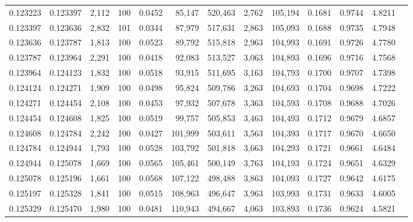\begin{tabular}{rrrrrrrrrrrrr}
0.123223 & 0.123397 & 2,112 & 100 &                                     0.0452 &  85,147 & 520,463 &   2,762 & 105,194 & 0.1681 & 0.9744 & 4.8211 \\
0.123397 & 0.123636 & 2,832 & 101 &                                     0.0344 &  87,979 & 517,631 &   2,863 & 105,093 & 0.1688 & 0.9735 & 4.7948 \\
0.123636 & 0.123787 & 1,813 & 100 &                                     0.0523 &  89,792 & 515,818 &   2,963 & 104,993 & 0.1691 & 0.9726 & 4.7780 \\
0.123787 & 0.123964 & 2,291 & 100 &                                     0.0418 &  92,083 & 513,527 &   3,063 & 104,893 & 0.1696 & 0.9716 & 4.7568 \\
0.123964 & 0.124123 & 1,832 & 100 &                                     0.0518 &  93,915 & 511,695 &   3,163 & 104,793 & 0.1700 & 0.9707 & 4.7398 \\
0.124124 & 0.124271 & 1,909 & 100 &                                     0.0498 &  95,824 & 509,786 &   3,263 & 104,693 & 0.1704 & 0.9698 & 4.7222 \\
0.124271 & 0.124454 & 2,108 & 100 &                                     0.0453 &  97,932 & 507,678 &   3,363 & 104,593 & 0.1708 & 0.9688 & 4.7026 \\
0.124454 & 0.124608 & 1,825 & 100 &                                     0.0519 &  99,757 & 505,853 &   3,463 & 104,493 & 0.1712 & 0.9679 & 4.6857 \\
0.124608 & 0.124784 & 2,242 & 100 &                                     0.0427 & 101,999 & 503,611 &   3,563 & 104,393 & 0.1717 & 0.9670 & 4.6650 \\
0.124784 & 0.124944 & 1,793 & 100 &                                     0.0528 & 103,792 & 501,818 &   3,663 & 104,293 & 0.1721 & 0.9661 & 4.6484 \\
0.124944 & 0.125078 & 1,669 & 100 &                                     0.0565 & 105,461 & 500,149 &   3,763 & 104,193 & 0.1724 & 0.9651 & 4.6329 \\
0.125078 & 0.125196 & 1,661 & 100 &                                     0.0568 & 107,122 & 498,488 &   3,863 & 104,093 & 0.1727 & 0.9642 & 4.6175 \\
0.125197 & 0.125328 & 1,841 & 100 &                                     0.0515 & 108,963 & 496,647 &   3,963 & 103,993 & 0.1731 & 0.9633 & 4.6005 \\
0.125329 & 0.125470 & 1,980 & 100 &                                     0.0481 & 110,943 & 494,667 &   4,063 & 103,893 & 0.1736 & 0.9624 & 4.5821 \\

\end{tabular}
